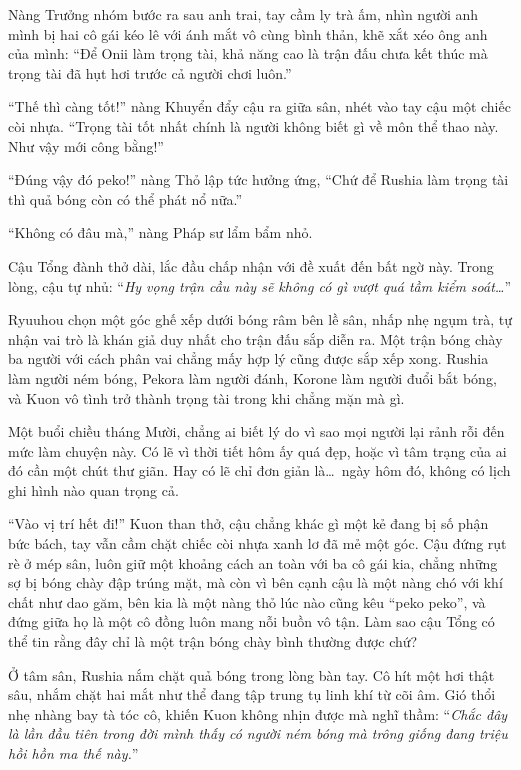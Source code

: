 \documentclass[../main.tex]{subfiles}
\begin{document}
Nàng Trưởng nhóm bước ra sau anh trai, tay cầm ly trà ấm, nhìn người anh mình bị hai cô gái kéo lê với ánh mắt vô cùng bình thản, khẽ xắt xéo ông anh của mình: ``Để Onii làm trọng tài, khả năng cao là trận đấu chưa kết thúc mà trọng tài đã hụt hơi trước cả người chơi luôn.''

``Thế thì càng tốt!'' nàng Khuyển đẩy cậu ra giữa sân, nhét vào tay cậu một chiếc còi nhựa. ``Trọng tài tốt nhất chính là người không biết gì về môn thể thao này. Như vậy mới công bằng!''

``Đúng vậy đó peko!'' nàng Thỏ lập tức hưởng ứng, ``Chứ để Rushia làm trọng tài thì quả bóng còn có thể phát nổ nữa.''

``Không có đâu mà,'' nàng Pháp sư lẩm bẩm nhỏ.

Cậu Tổng đành thở dài, lắc đầu chấp nhận với đề xuất đến bất ngờ này. Trong lòng, cậu tự nhủ: ``\textit{Hy vọng trận cầu này sẽ không có gì vượt quá tầm kiểm soát\dots}''

Ryuuhou chọn một góc ghế xếp dưới bóng râm bên lề sân, nhấp nhẹ ngụm trà, tự nhận vai trò là khán giả duy nhất cho trận đấu sắp diễn ra. Một trận bóng chày ba người với cách phân vai chẳng mấy hợp lý cũng được sắp xếp xong. Rushia làm người ném bóng, Pekora làm người đánh, Korone làm người đuổi bắt bóng, và Kuon vô tình trở thành trọng tài trong khi chẳng mặn mà gì.

Một buổi chiều tháng Mười, chẳng ai biết lý do vì sao mọi người lại rảnh rỗi đến mức làm chuyện này. Có lẽ vì thời tiết hôm ấy quá đẹp, hoặc vì tâm trạng của ai đó cần một chút thư giãn. Hay có lẽ chỉ đơn giản là\dots\ ngày hôm đó, không có lịch ghi hình nào quan trọng cả.

\ct

``Vào vị trí hết đi!'' Kuon than thở, cậu chẳng khác gì một kẻ đang bị số phận bức bách, tay vẫn cầm chặt chiếc còi nhựa xanh lơ đã mẻ một góc. Cậu đứng rụt rè ở mép sân, luôn giữ một khoảng cách an toàn với ba cô gái kia, chẳng những sợ bị bóng chày đập trúng mặt, mà còn vì bên cạnh cậu là một nàng chó với khí chất như dao găm, bên kia là một nàng thỏ lúc nào cũng kêu ``peko peko'', và đứng giữa họ là một cô đồng luôn mang nỗi buồn vô tận. Làm sao cậu Tổng có thể tin rằng đây chỉ là một trận bóng chày bình thường được chứ?

Ở tâm sân, Rushia nắm chặt quả bóng trong lòng bàn tay. Cô hít một hơi thật sâu, nhắm chặt hai mắt như thể đang tập trung tụ linh khí từ cõi âm. Gió thổi nhẹ nhàng bay tà tóc cô, khiến Kuon không nhịn được mà nghĩ thầm: ``\textit{Chắc đây là lần đầu tiên trong đời mình thấy có người ném bóng mà trông giống đang triệu hồi hồn ma thế này.}''
\end{document}
